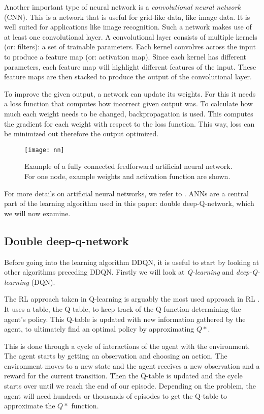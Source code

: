 Another important type of neural network is a \emph{convolutional neural network} (CNN). This is a network that is useful for grid-like data, like image data. It is well suited for applications like image recognition. Such a network makes use of at least one convolutional layer. A convolutional layer consists of multiple kernels (or: filters): a set of trainable parameters. Each kernel convolves across the input to produce a feature map (or: activation map). Since each kernel has different parameters, each feature map will highlight different features of the input. These feature maps are then stacked to produce the output of the convolutional layer.

To improve the given output, a network can update its weights. For this it needs a loss function that computes how incorrect given output was. To calculate how much each weight needs to be changed, backpropagation is used. This computes the gradient for each weight with respect to the loss function. This way, loss can be minimized out therefore the output optimized.

\begin{figure}[h]
    \centering
    \texttt{[image: nn]}
    \caption{Example of a fully connected feedforward artificial neural network. For one node, example weights and activation function are shown.}
    \label{fig:nn}
\end{figure}

For more details on artificial neural networks, we refer to \cite{nn}. ANNs are a central part of the learning algorithm used in this paper: double deep-Q-network, which we will now examine.

\subsection{Double deep-q-network}\label{pl-dqn}
Before going into the learning algorithm DDQN, it is useful to start by looking at other algorithms preceding DDQN. Firstly we will look at \emph{Q-learning} and \emph{deep-Q-learning} (DQN). 

The RL approach taken in Q-learning is arguably the most used approach in RL \cite{qlearning}. It uses a table, the Q-table, to keep track of the Q-function determining the agent's policy. This Q-table is updated with new information gathered by the agent, to ultimately find an optimal policy by approximating $Q*$.

This is done through a cycle of interactions of the agent with the environment. The agent starts by getting an observation and choosing an action. The environment moves to a new state and the agent receives a new observation and a reward for the current transition. Then the Q-table is updated and the cycle starts over until we reach the end of our episode. Depending on the problem, the agent will need hundreds or thousands of episodes to get the Q-table to approximate the $Q*$ function.

